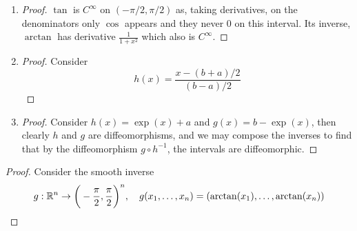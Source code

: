\begin{problem}
\end{problem}

\begin{enumerate}[label=(\alph*)]
	\item \begin{proof}
		      $\tan$ is $C^\infty$ on $(-\pi/2,\pi/2)$ as, taking derivatives, on the denominators only $\cos$ appears and they never 0
		      on this interval. Its inverse, $\arctan$ has derivative $\frac{1}{1+x^2}$ which
		      also is $C^\infty$.
	      \end{proof}
	\item \begin{proof}
		      Consider
		      $$h(x) = \frac{x - (b+a)/2}{(b-a)/2}$$
	      \end{proof}
	\item \begin{proof}
		      Consider $h(x) = \exp(x) + a$ and $g(x) = b - \exp(x)$, then clearly $h$ and $g$ are diffeomorphisms, and we may compose
		      the inverses to find that by the diffeomorphism $g\circ h^{-1}$, the intervals are diffeomorphic.
	      \end{proof}
\end{enumerate}

\begin{problem}
\end{problem}
\begin{proof}
	Consider the smooth inverse
	$$g : \mathbb{R}^n \rightarrow \bigg(-\frac{\pi}{2}, \frac{\pi}{2}\bigg)^n,\quad g(x_1, \dots, x_n) = (\arctan(x_1), \dots, \arctan(x_n))$$
\end{proof}

